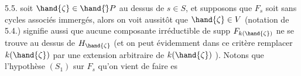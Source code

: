 5.5.  soit $\hand{\zeta}\in\hand{\check{}}P$ au dessus de $s\in S$, et supposons
que $F_s$ soit sans cycles associés immergés, alors on voit aussitôt que
$\hand{\zeta}\in V$ (notation de 5.4.) signifie aussi que aucune composante
irréductible de supp $F_{k(\hand{\zeta})}$ ne se trouve au dessus de $H_{\hand{\zeta}}$ (et on peut
évidemment dans ce critère remplacer $k(\hand{\zeta})$ par une extension arbitraire
de $k(\hand{\zeta})$ ). Notons que l'hypothèse $(S_1)$ sur $F_s$ qu'on vient de faire es


